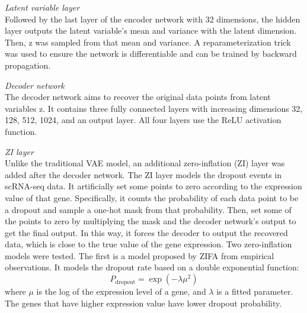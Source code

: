 \vspace{0.5cm}
\noindent\emph{Latent variable layer} \\
Followed by the last layer of the encoder network with 32 dimensions, the hidden layer outputs the latent variable's mean and variance with the latent dimension. Then, z was sampled from that mean and variance. A reparameterization trick was used to ensure the network is differentiable and can be trained by backward propagation.

\vspace{0.5cm}
\noindent\emph{Decoder network} \\
The decoder network aims to recover the original data points from latent variables z. It contains three fully connected layers with increasing dimensions 32, 128, 512, 1024, and an output layer. All four layers use the ReLU activation function. 

\vspace{0.5cm}
\noindent\emph{ZI layer} \\
Unlike the traditional VAE model, an additional zero-inflation (ZI) layer was added after the decoder network. The ZI layer models the dropout events in scRNA-seq data. It artificially set some points to zero according to the expression value of that gene. Specifically, it counts the probability of each data point to be a dropout and sample a one-hot mask from that probability. Then, set some of the points to zero by multiplying the mask and the decoder network's output to get the final output. In this way, it forces the decoder to output the recovered data, which is close to the true value of the gene expression. Two zero-inflation models were tested. The first is a model proposed by ZIFA \cite{Pierson2015} from empirical observations. It models the dropout rate based on a double exponential function: 
\begin{equation}
    P_{\text {dropout}}=\exp \left(-\lambda \mu^{2}\right)
\end{equation}
where $\mu$ is the log of the expression level of a gene, and $\lambda$ is a fitted parameter. The genes that have higher expression value have lower dropout probability.  

